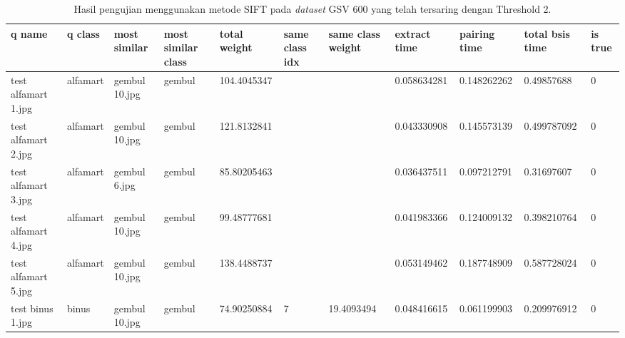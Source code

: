 \begin{landscape}
	\begin{longtable}{|p{2cm}|p{1.5cm}|p{2cm}|p{1.5cm}|p{2cm}|p{1cm}|p{2cm}|p{2cm}|p{2cm}|p{2cm}|p{1cm}|}
		\caption{Hasil pengujian menggunakan metode SIFT pada \textit{dataset} GSV 600 yang telah tersaring dengan Threshold 2.} \\
		\hline
		\textbf{q name}      & \textbf{q class} & \textbf{most similar} & \textbf{most similar class} & \textbf{total weight} & \textbf{same class idx} & \textbf{same class weight} & \textbf{extract time} & \textbf{pairing time} & \textbf{total bsis time} & \textbf{is true} \\ \hline
		test alfamart 1.jpg  & alfamart         & gembul 10.jpg         & gembul                      & 104.4045347           &                         &                            & 0.058634281           & 0.148262262           & 0.49857688               & 0                \\ \hline
		test alfamart 2.jpg  & alfamart         & gembul 10.jpg         & gembul                      & 121.8132841           &                         &                            & 0.043330908           & 0.145573139           & 0.499787092              & 0                \\ \hline
		test alfamart 3.jpg  & alfamart         & gembul 6.jpg          & gembul                      & 85.80205463           &                         &                            & 0.036437511           & 0.097212791           & 0.31697607               & 0                \\ \hline
		test alfamart 4.jpg  & alfamart         & gembul 10.jpg         & gembul                      & 99.48777681           &                         &                            & 0.041983366           & 0.124009132           & 0.398210764              & 0                \\ \hline
		test alfamart 5.jpg  & alfamart         & gembul 10.jpg         & gembul                      & 138.4488737           &                         &                            & 0.053149462           & 0.187748909           & 0.587728024              & 0                \\ \hline
		test binus 1.jpg     & binus            & gembul 10.jpg         & gembul                      & 74.90250884           & 7                       & 19.4093494                 & 0.048416615           & 0.061199903           & 0.209976912              & 0                \\ \hline

\end{longtable}
\end{landscape}
